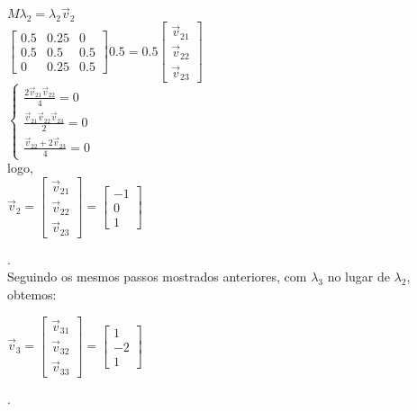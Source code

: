 \documentclass[14pt]{article}
\begin{document}
\begin{center}
    $ M\lambda_2 = \lambda_2 \vec{v}_2  $\\
    $ $\\
    $\begin{bmatrix}
    0.5&0.25&0\\
    0.5&0.5&0.5\\
    0&0.25&0.5
    \end{bmatrix} 0.5 = 0.5 \begin{bmatrix} \vec{v}_{21}\\ \vec{v}_{22}\\ \vec{v}_{23} \end{bmatrix}$\\
    $ $\\
    $ $\\
    $\begin{cases}
        \frac{2\vec{v}_{21} \vec{v}_{22}}{4} = 0\\
        \frac{\vec{v}_{21} \vec{v}_{22} \vec{v}_{23}}{2} = 0\\
        \frac{\vec{v}_{22}+2 \vec{v}_{23}}{4} = 0 \end{cases}
    $
    $ $\\
    $ $\\
    logo,\\
    $ $\\
    $\vec{v}_2 = \begin{bmatrix} \vec{v}_{21}\\ \vec{v}_{22}\\ \vec{v}_{23} \end{bmatrix} = \begin{bmatrix} -1\\ 0\\ 1 \end{bmatrix}$ 
\end{center}.
$ $\\
$ $\\

Seguindo os mesmos passos mostrados anteriores, com $\lambda_3$ no lugar de $\lambda_2$, obtemos:

\begin{center}
    $\vec{v}_3 = \begin{bmatrix} \vec{v}_{31}\\ \vec{v}_{32}\\ \vec{v}_{33} \end{bmatrix} = \begin{bmatrix} 1\\ -2\\ 1 \end{bmatrix}$
\end{center}.
\end{document}
